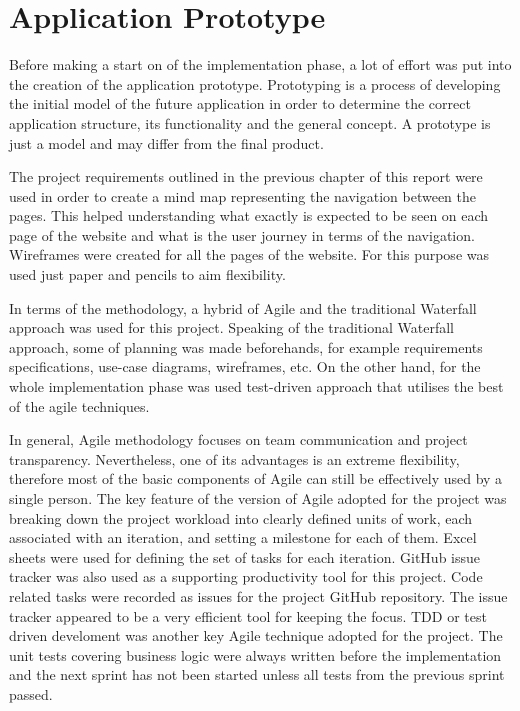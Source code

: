 \chapter{Application Prototype}\label{ch:Prototype}

Before making a start on of the implementation phase, a lot of effort was put into the creation of the application prototype. Prototyping is a process of developing the initial model of the future application in order to determine the correct application structure, its functionality and the general concept. A prototype is just a model and may differ from the final product.

The project requirements outlined in the previous chapter of this report were used in order to create a mind map representing the navigation between the pages. This helped understanding what exactly is expected to be seen on each page of the website and what is the user journey in terms of the navigation. Wireframes were created for all the pages of the website. For this purpose was used just paper and pencils to aim flexibility.

In terms of the methodology, a hybrid of Agile and the traditional Waterfall approach was used for this project. Speaking of the traditional Waterfall approach, some of planning was made beforehands, for example requirements specifications, use-case diagrams, wireframes, etc. On the other hand, for the whole implementation phase was used test-driven approach that utilises the best of the agile techniques.

In general, Agile methodology focuses on team communication and project transparency. Nevertheless, one of its advantages is an extreme flexibility, therefore most of the basic components of Agile can still be effectively used by a single person. The key feature of the version of Agile adopted for the project was breaking down the project workload into clearly defined units of work, each associated with an iteration, and setting a milestone for each of them. Excel sheets were used for defining the set of tasks for each iteration. GitHub issue tracker was also used as a supporting productivity tool for this project. Code related tasks were recorded as issues for the project GitHub repository. The issue tracker appeared to be a very efficient tool for keeping the focus. TDD or test driven develoment was another key Agile technique adopted for the project. The unit tests covering business logic were always written before the implementation and the next sprint has not been started unless all tests from the previous sprint passed. 

